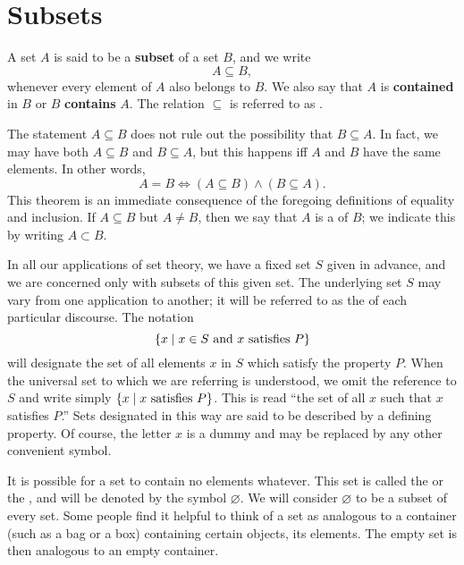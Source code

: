 \section{Subsets}\label{sec:1.2.3}

\begin{defn}\label{defn:1.2.4}
  A set \(A\) is said to be a \textbf{subset} of a set \(B\), and we write
  \[
    A \subseteq B,
  \]
  whenever every element of \(A\) also belongs to \(B\).
  We also say that \(A\) is \textbf{contained} in \(B\) or \(B\) \textbf{contains} \(A\).
  The relation \(\subseteq\) is referred to as \textbf{}.

  The statement \(A \subseteq B\) does not rule out the possibility that \(B \subseteq A\).
  In fact, we may have both \(A \subseteq B\) and \(B \subseteq A\), but this happens iff \(A\) and \(B\) have the same elements.
  In other words,
  \[
    A = B \iff (A \subseteq B) \land (B \subseteq A).
  \]
  This theorem is an immediate consequence of the foregoing definitions of equality and inclusion.
  If \(A \subseteq B\) but \(A \neq B\), then we say that \(A\) is a \textbf{} of \(B\);
  we indicate this by writing \(A \subset B\).
\end{defn}

\begin{defn}\label{defn:1.2.5}
  In all our applications of set theory, we have a fixed set \(S\) given in advance, and we are concerned only with subsets of this given set.
  The underlying set \(S\) may vary from one application to another;
  it will be referred to as the \textbf{} of each particular discourse.
  The notation
  \[
    \left\lbrace x \mid x \in S \text{ and } x \text{ satisfies } P\right\rbrace
  \]
  will designate the set of all elements \(x\) in \(S\) which satisfy the property \(P\).
  When the universal set to which we are referring is understood, we omit the reference to \(S\) and write simply \(\left\lbrace x \mid x \text{ satisfies } P\right\rbrace\).
  This is read ``the set of all \(x\) such that \(x\) satisfies \(P\).''
  Sets designated in this way are said to be described by a defining property.
  Of course, the letter \(x\) is a dummy and may be replaced by any other convenient symbol.
\end{defn}

\begin{defn}\label{defn:1.2.6}
  It is possible for a set to contain no elements whatever.
  This set is called the \textbf{} or the \textbf{}, and will be denoted by the symbol \(\varnothing\).
  We will consider \(\varnothing\) to be a subset of every set.
  Some people find it helpful to think of a set as analogous to a container (such as a bag or a box) containing certain objects, its elements.
  The empty set is then analogous to an empty container.
\end{defn}

